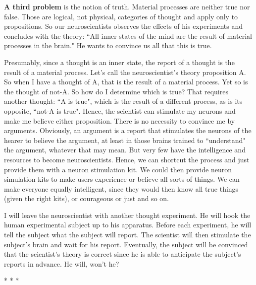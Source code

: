 \textbf{A third problem} is the notion of truth. Material processes are neither true nor false. Those are logical, not physical, categories of thought and apply only to propositions. So our neuroscientists observes the effects of his experiments and concludes with the theory: ``All inner states of the mind are the result of material processes in the brain." He wants to convince us all that this is true.

Presumably, since a thought is an inner state, the report of a thought is the result of a material process. Let's call the neuroscientist's theory proposition A. So when I have a thought of A, that is the result of a material process. Yet so is the thought of not-A. So how do I determine which is true? That requires another thought: ``A is true", which is the result of a different process, as is its opposite, ``not-A is true". Hence, the scientist can stimulate my neurons and make me believe either proposition. There is no necessity to convince me by arguments. Obviously, an argument is a report that stimulates the neurons of the hearer to believe the argument, at least in those brains trained to ``understand" the argument, whatever that may mean. But very few have the intelligence and resources to become neuroscientists. Hence, we can shortcut the process and just provide them with a neuron stimulation kit. We could then provide neuron simulation kits to make users experience or believe all sorts of things. We can make everyone equally intelligent, since they would then know all true things (given the right kits), or courageous or just and so on.

\begin{quotex}
I will leave the neuroscientist with another thought experiment. He will hook the human experimental subject up to his apparatus. Before each experiment, he will tell the subject what the subject will report. The scientist will then stimulate the subject's brain and wait for his report. Eventually, the subject will be convinced that the scientist's theory is correct since he is able to anticipate the subject's reports in advance. He will, won't he?
\end{quotex}



\begin{center}* * *\end{center}

